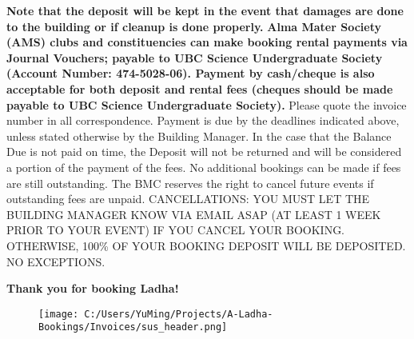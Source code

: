 \documentclass{article}%
\begin{document}
\newline%
\textbf{Note that the deposit will be kept in the event that damages are done to the building                             or if cleanup is done properly.}%
\newline%
\newline%
\textbf{Alma Mater Society (AMS) clubs and constituencies         can make booking rental payments via Journal Vouchers; payable to UBC Science Undergraduate Society         (Account Number: 474{-}5028{-}06). Payment by cash/cheque is also acceptable for both deposit and rental fees         (cheques should be made payable to UBC Science Undergraduate Society).}%
\newline%
\newline%
Please quote the invoice number in all correspondence.         Payment is due by the deadlines indicated above, unless stated otherwise by the Building Manager.         In the case that the Balance Due is not paid on time, the Deposit will not be returned         and will be considered a portion of the payment of the fees. No additional bookings can be made if fees are still outstanding.         The BMC reserves the right to cancel future events if outstanding fees are unpaid.%
\newline%
\newline%
CANCELLATIONS:  YOU MUST LET THE BUILDING MANAGER KNOW VIA EMAIL ASAP         (AT LEAST 1 WEEK PRIOR TO YOUR EVENT) IF YOU CANCEL YOUR BOOKING.         OTHERWISE, 100\% OF YOUR BOOKING DEPOSIT WILL BE DEPOSITED. NO EXCEPTIONS.%
\newline%
\begin{center}%
\textbf{Thank you for booking Ladha!}%
\end{center}%
\newpage%


\begin{figure}[h!]%
\centering%
\centering%
\texttt{[image: C:/Users/YuMing/Projects/A-Ladha-Bookings/Invoices/sus\_header.png]}%
\end{figure}
\end{document}
